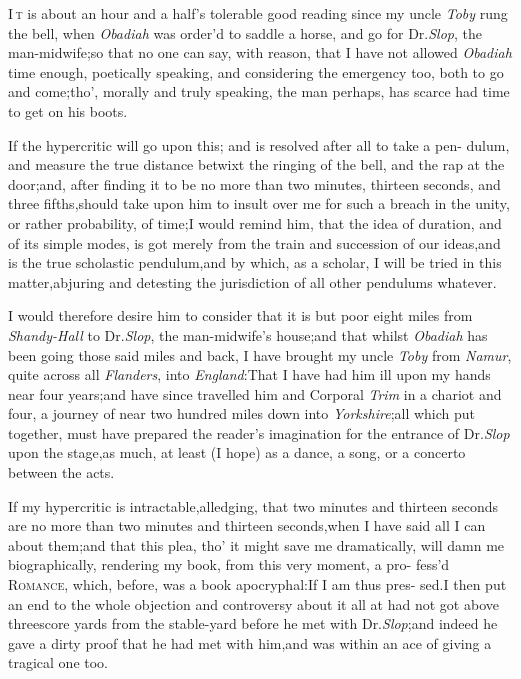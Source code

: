 \documentclass{article}
\begin{document}
\lettrine{I}{\,t} is about an hour and a
half’s tolerable good reading since my uncle \textit{Toby} rung
the bell, when \textit{Obadiah} was order’d to saddle a horse, and go
for Dr.\@ \textit{Slop}, the man-midwife;\tsk so that no one can say,
with reason, that I have not allowed \textit{Obadiah} time enough,
poetically speaking, and considering the emergen\-cy too, both to go
and come;\tsh tho’, morally and truly speaking, the
man perhaps, has scarce had time to get on\break
his boots.

If the hypercritic will go upon this; and is resolved after all
to take a pen- dulum, and measure the true distance betwixt the
ringing of the bell, and the rap at the door;\tsk and, after
finding it to be no more than two minutes, thirteen seconds, and
three fifths,\tsk should take upon him to insult over me for such
a breach in the unity, or rather probability, of time;\tsk I would
remind him, that the idea of duration, and of its simple modes, is
got merely from the train and succession of our
ideas,\tsk and is the true scholastic
pendulum,\tsh and by which, as a scholar, I will be tried
in this matter,\tsk\break abjuring and detesting the jurisdiction of
all other pendulums whatever.

I would therefore desire him to consider that it is but poor
eight miles from \textit{Shandy-Hall} to Dr.\@ \textit{Slop}, the
man-mid\-wife’s house;\tsk and that whilst \textit{Obadiah} has
been going those said miles and back,
I have brought my uncle
\textit{Toby} from \textit{Namur}, quite across all \textit{Flanders}, into
\textit{England}:\tsk That I have had him ill upon my hands near
four years;\tsk and have since travelled him and Corporal
\textit{Trim} in a chariot and four, a journey of near two hundred
miles down into \textit{Yorkshire};\tsk all which put together,
must have prepared the reader’s imagination for the entrance
of Dr.\@ \textit{Slop} upon the stage,\tsk as much, at least (I hope)
as a dance, a song, or a concerto between the acts.

If my hypercritic is intractable,\tsk al\-ledging, that two minutes
and thirteen seconds are no more than two minutes and thirteen
seconds,\tsk when I have said all I can about them;\tsk and that this
plea, tho’ it might save me dramatically, will damn me
biographically, rendering my book, from this very moment, a
pro-
fess’d \textsc{Romance}, which, before, was a book
apocryphal:\tsk If I am thus pres-\break
sed.\tsk I then put an
end to the whole objection and controversy about it all
at\break
{}
had not got above threescore yards from the stable-yard before he met
with Dr.\@ \textit{Slop};\tsk and indeed he gave a dirty
proof that he had met with him,\tsk and was within an ace of giving a
tragical one\break
too.  
\end{document}
